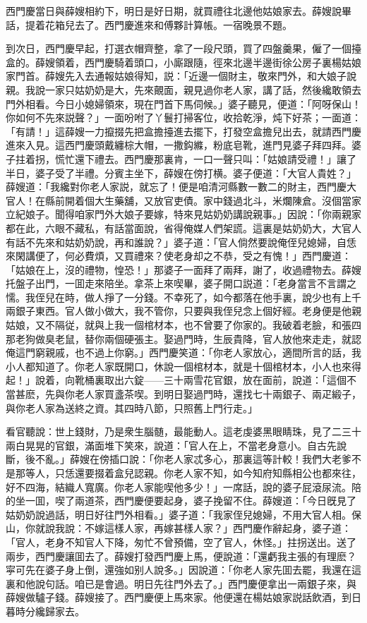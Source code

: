 西門慶當日與薛嫂相約下，明日是好日期，就買禮往北邊他姑娘家去。薛嫂說畢話，提着花箱兒去了。西門慶進來和傅夥計算帳。一宿晚景不題。

到次日，西門慶早起，打選衣帽齊整，拿了一段尺頭，買了四盤羹果，僱了一個擡盒的。薛嫂領着，西門慶騎着頭口，小廝跟隨，徑來北邊半邊街徐公房子裏楊姑娘家門首。薛嫂先入去通報姑娘得知，説：「近邊一個財主，敬來門外，和大娘子說親。我說一家只姑奶奶是大，先來覿面，親見過你老人家，講了話，然後纔敢領去門外相看。今日小媳婦領來，現在門首下馬伺候。」婆子聽見，便道：「阿呀保山！你如何不先來説聲？」一面吩咐了丫鬟打掃客位，收拾乾淨，炖下好茶；一面道：「有請！」這薛嫂一力攛掇先把盒擔擡進去擺下，打發空盒擔兒出去，就請西門慶進來入見。這西門慶頭戴纏棕大帽，一撒鈎縧，粉底皂靴，進門見婆子拜四拜。婆子拄着拐，慌忙還下禮去。西門慶那裏肯，一口一聲只叫：「姑娘請受禮！」讓了半日，婆子受了半禮。分賓主坐下，薛嫂在傍打横。婆子便道：「大官人貴姓？」薛嫂道：「我纔對你老人家説，就忘了！便是咱清河縣數一數二的財主，西門慶大官人！在縣前開着個大生藥舖，又放官吏債。家中錢過北斗，米爛陳倉。沒個當家立紀娘子。聞得咱家門外大娘子要嫁，特來見姑奶奶講說親事。」因說：「你兩親家都在此，六眼不藏私，有話當面說，省得俺媒人們架謊。這裏是姑奶奶大，大官人有話不先來和姑奶奶說，再和誰說？」婆子道：「官人倘然要說俺侄兒媳婦，自恁來閑講便了，何必費煩，又買禮來？使老身却之不恭，受之有愧！」西門慶道：「姑娘在上，沒的禮物，惶恐！」那婆子一面拜了兩拜，謝了，收過禮物去。薛嫂托盤子出門，一囬走來陪坐。拿茶上來喫畢，婆子開口説道：「老身當言不言謂之懦。我侄兒在時，做人掙了一分錢。不幸死了，如今都落在他手裏，說少也有上千兩銀子東西。官人做小做大，我不管你，只要與我侄兒念上個好經。老身便是他親姑娘，又不隔従，就與上我一個棺材本，也不曾要了你家的。我破着老臉，和張四那老狗做臭老鼠，替你兩個硬張主。娶過門時，生辰貴降，官人放他來走走，就認俺這門窮親戚，也不過上你窮。」西門慶笑道：「你老人家放心，適間所言的話，我小人都知道了。你老人家既開口，休說一個棺材本，就是十個棺材本，小人也來得起！」說着，向靴桶裏取出六錠——三十兩雪花官銀，放在面前，說道：「這個不當甚麽，先與你老人家買盞茶喫。到明日娶過門時，還找七十兩銀子、兩疋緞子，與你老人家為送終之資。其四時八節，只照舊上門行走。」

看官聽說：世上錢財，乃是衆生腦髄，最能動人。這老虔婆黑眼睛珠，見了二三十兩白晃晃的官銀，滿面堆下笑來，說道：「官人在上，不當老身意小。自古先說斷，後不亂。」薛嫂在傍插口說：「你老人家忒多心，那裏這等計較！我們大老爹不是那等人，只恁還要掇着盒兒認親。你老人家不知，如今知府知縣相公也都來往，好不四海，結織人寬廣。你老人家能喫他多少！」一席話，說的婆子屁滾尿流。陪的坐一囬，喫了兩道茶，西門慶便要起身，婆子挽留不住。薛嫂道：「今日旣見了姑奶奶說過話，明日好往門外相看。」婆子道：「我家侄兒媳婦，不用大官人相。保山，你就說我說：不嫁這樣人家，再嫁甚樣人家？」西門慶作辭起身，婆子道：「官人，老身不知官人下降，匆忙不曾預備，空了官人，休怪。」拄拐送出。送了兩步，西門慶讓囬去了。薛嫂打發西門慶上馬，便說道：「還虧我主張的有理麽？寜可先在婆子身上倒，還強如别人說多。」因說道：「你老人家先囬去罷，我還在這裏和他說句話。咱已是會過。明日先往門外去了。」西門慶便拿出一兩銀子來，與薛嫂做驢子錢。薛嫂接了。西門慶便上馬來家。他便還在楊姑娘家説話飲酒，到日暮時分纔歸家去。

